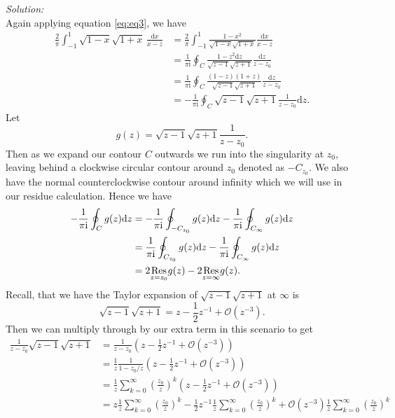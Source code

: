 \documentclass[10pt]{amsart}
\newcommand{\D}{\mathrm{d}}
\newcommand{\I}{\mathrm{i}}
\theoremstyle{nonumberplain}
\begin{document}
\begin{enumerate}[label={\bf {\arabic*}:}]
\begin{enumerate}
\textit{Solution:} \\
Again applying equation \eqref{eq:eq3}, we have \\
\begin{align*}
\frac{2}{\pi} \int_{-1}^1 \sqrt{1 -x} \sqrt{1 + x}\, \frac{\D x}{x -z}
	&= \frac{2}{\pi}  \int_{-1}^1 \frac{1 - x^2}{\sqrt{1 - x} \sqrt{1 + x}} \frac{\D x}{x -z}\\
	&= \frac{1}{\pi \I} \oint_C \frac{1 - z^2\D z}{\sqrt{z -1} \sqrt{z + 1}} \frac{\D z}{z - z_0} \\
	&= \frac{1}{\pi \I} \oint_C \frac{(1 - z)(1 + z) }{\sqrt{z -1} \sqrt{z + 1}} \frac{\D z}{z - z_0} \\
	&= - \frac 1 {\pi \I} \oint_C \sqrt {z - 1} \sqrt {z + 1} \frac 1 {z - z_0} \D z.
\end{align*}
Let
$$g(z) = \sqrt {z - 1} \sqrt {z + 1} \frac 1 {z - z_0}.$$
Then as we expand our contour $C$ outwards we run into the singularity at $z_0$, leaving behind a clockwise circular contour around $z_0$ denoted as $-C_{z_0}$.
We also have the normal counterclockwise contour around infinity which we will use in our residue calculation.
Hence we have
\begin{align}
- \frac 1 {\pi \I} \oint_C g(z) \D z
	&= - \frac 1 {\pi \I} \oint_{-C_{z_0}} g(z) \D z - \frac 1 {\pi \I} \oint_{C_\infty} g(z) \D z \nonumber \\
	&= \frac 1 {\pi \I} \oint_{C_{z_0}} g(z) \D z - \frac 1 {\pi \I} \oint_{C_\infty} g(z) \D z \nonumber \\
	&= 2 \underset{z=z_0}{{\rm Res}} g(z) - 2 \underset{z=\infty}{{\rm Res}} g(z).
\label{eq:eq5}
\end{align}
Recall, that we have the Taylor expansion of $\sqrt {z - 1} \sqrt {z + 1}$ at $\infty$ is
$$
\sqrt {z - 1} \sqrt {z + 1} = z - \frac 1 2 z^{-1} + \mathcal O(z^{-3}).
$$
Then we can multiply through by our extra term in this scenario to get
\begin{align*}
\frac 1 {z - z_0}\sqrt {z - 1} \sqrt {z + 1} &= \frac 1 {z - z_0} \left(z - \frac 1 2 z^{-1} + \mathcal O(z^{-3})\right) \\
	&= \frac 1 z \frac 1 {1 - z_0/z} \left(z - \frac 1 2 z^{-1} + \mathcal O(z^{-3})\right) \\
	&= \frac 1 z \sum_{k = 0}^\infty \left(\frac {z_0} z\right)^k \left(z - \frac 1 2 z^{-1} + \mathcal O(z^{-3})\right) \\
	&=  z\frac 1 z \sum_{k = 0}^\infty \left(\frac {z_0} z\right)^k - \frac 1 2 z^{-1}\frac 1 z \sum_{k = 0}^\infty \left(\frac {z_0} z\right)^k + \mathcal O(z^{-3})\frac 1 z \sum_{k = 0}^\infty \left(\frac {z_0} z\right)^k \\

\end{align*}
\end{enumerate}
\end{enumerate}
\end{document}
